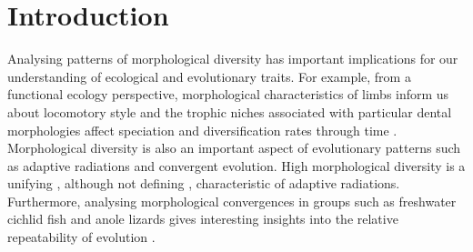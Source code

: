 \chapter{Introduction}
\label{chap:introduction}






\noindent



	Analysing patterns of morphological diversity has important implications for our understanding of ecological and evolutionary traits. For example, from a functional ecology perspective, morphological characteristics of limbs inform us about locomotory style \citep[e.g.][]{Bou1987} and the trophic niches associated with particular dental morphologies affect speciation and diversification rates through time \citep{Price2012}. Morphological diversity is also an important aspect of evolutionary patterns such as adaptive radiations and convergent evolution. High morphological diversity is a unifying \citep{Losos2010a, Olson2009}, although not defining \citep{Glor2010, Olson2009}, characteristic of adaptive radiations. Furthermore, analysing morphological convergences in groups such as freshwater cichlid fish \citep{Muschick2012} and anole lizards \citep{Mahler2013} gives interesting insights into the relative repeatability of evolution \citep{Losos2011}.

